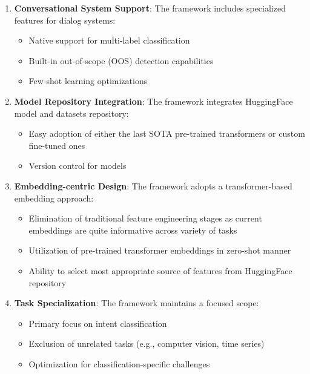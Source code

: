 \begin{enumerate}
    \item \textbf{Conversational System Support}: The framework includes specialized features for dialog systems:
    \begin{itemize}
        \item Native support for multi-label classification
        \item Built-in out-of-scope (OOS) detection capabilities
        \item Few-shot learning optimizations
    \end{itemize}

    \item \textbf{Model Repository Integration}: The framework integrates HuggingFace model and datasets repository:
    \begin{itemize}
        \item Easy adoption of either the last SOTA pre-trained transformers or custom fine-tuned ones
        \item Version control for models
    \end{itemize}

    \item \textbf{Embedding-centric Design}: The framework adopts a transformer-based embedding approach:
    \begin{itemize}
        \item Elimination of traditional feature engineering stages as current embeddings are quite informative across variety of tasks \cite{enevoldsen2025mmtebmassivemultilingualtext}
        \item Utilization of pre-trained transformer embeddings in zero-shot manner
        \item Ability to select most appropriate source of features from HuggingFace repository
    \end{itemize}

    \item \textbf{Task Specialization}: The framework maintains a focused scope:
    \begin{itemize}
        \item Primary focus on intent classification
        \item Exclusion of unrelated tasks (e.g., computer vision, time series)
        \item Optimization for classification-specific challenges
    \end{itemize}
\end{enumerate}

